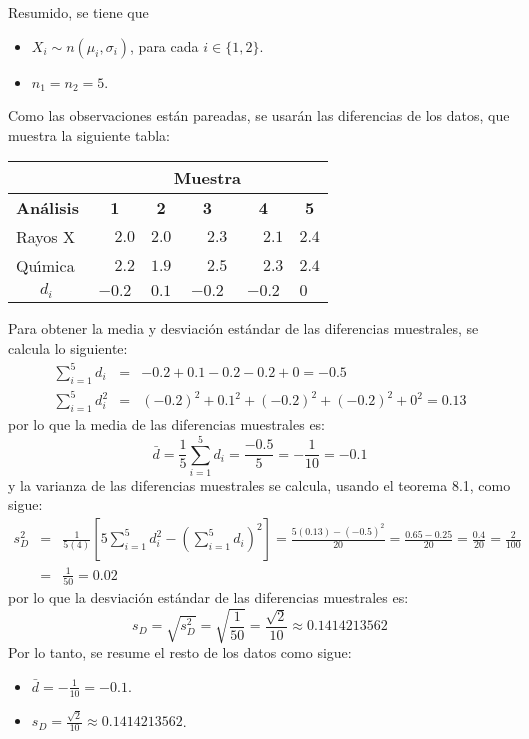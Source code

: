\begin{solucion}
 \begin{datos}
  Resumido, se tiene que
  \begin{itemize}
   \item $X_i \sim n\left( \mu_i, \sigma_i \right)$,
   para cada $i \in \{ 1, 2 \}$.
   \item $n_1 = n_2 = 5$.
  \end{itemize}
  Como las observaciones est\'an pareadas,
  se usar\'an las diferencias de los datos,
  que muestra la siguiente tabla:
  \begin{center}
   \begin{tabular}{l|ccccc}
    & \multicolumn{5}{c}{\textbf{Muestra}} \\
    \hline 
    \textbf{An\'alisis} & \textbf{1} & \textbf{2} & \textbf{3} &  \textbf{4} & \textbf{5} \\
    \hline 
    Rayos X & $\phantom{-}2.0$ & $2.0$ & $\phantom{-}2.3$ &
    $\phantom{-}2.1$ & $2.4$ \\
    Qu\'{\i}mica & $\phantom{-}2.2$ & $1.9$ & $\phantom{-}2.5$ &
    $\phantom{-}2.3$ & $2.4$ \\
    $\phantom{000}d_i$ & $-0.2$ & $0.1$ & $-0.2$ & $-0.2$ &
    $0\phantom{.4}$
   \end{tabular}
  \end{center}
  Para obtener la media y desviaci\'on est\'andar
  de las diferencias muestrales, se calcula lo siguiente:
  \begin{eqnarray*}
   \sum_{i=1}^5 d_i & = & -0.2 + 0.1 - 0.2 - 0.2 + 0 = -0.5 \\
   \sum_{i=1}^5 d_i^2 & = &
   (-0.2)^2 + 0.1^2 + (-0.2)^2 + (-0.2)^2 + 0^2 = 0.13
  \end{eqnarray*}
  por lo que la media de las diferencias muestrales es:
  \begin{equation*}
   \bar{d} = \frac{1}{5} \sum_{i=1}^5 d_i = \frac{-0.5}{5} 
   = -\frac{1}{10} = -0.1
  \end{equation*}
  y la varianza de las diferencias muestrales se calcula,
  usando el teorema 8.1, como sigue:
  \begin{eqnarray*}
   s_D^2 & = &
   \frac{1}{5(4)}\left[
   5\sum_{i=1}^5 d_i^2 - \left( \sum_{i=1}^5 d_i \right)^2
   \right] = \frac{5(0.13) - (-0.5)^2}{20} = \frac{0.65 - 0.25}{20}
   = \frac{0.4}{20} = \frac{2}{100} \\
   & = & \frac{1}{50} = 0.02
  \end{eqnarray*}
  por lo que la desviaci\'on est\'andar de las diferencias
  muestrales es:
  \begin{equation*}
   s_D = \sqrt{s_D^2} = \sqrt{\frac{1}{50}} = \frac{\sqrt{2}}{10}
   \approx 0.1414213562
  \end{equation*}
  Por lo tanto, se resume el resto de los datos como sigue:
  \begin{itemize}
   \item $\bar{d} = -\frac{1}{10} = -0.1$.
   \item $s_D = \frac{\sqrt{2}}{10} \approx 0.1414213562$.
  \end{itemize}
 \end{datos}


\end{solucion}

